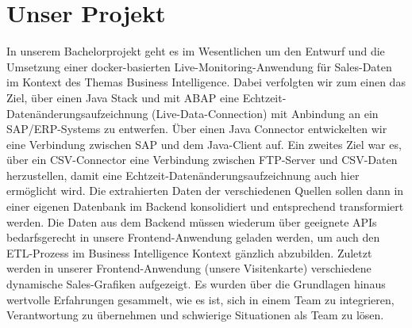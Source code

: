 \section*{Unser Projekt}
In unserem Bachelorprojekt geht es im Wesentlichen um den Entwurf und die Umsetzung einer docker-basierten Live-Monitoring-Anwendung für Sales-Daten im Kontext des Themas Business Intelligence.
\newline
\newline
Dabei verfolgten wir zum einen das Ziel, über einen Java Stack und mit ABAP  eine Echtzeit-Datenänderungsaufzeichnung (Live-Data-Connection) mit Anbindung an ein SAP/ERP-Systems zu entwerfen. Über einen Java Connector entwickelten wir eine Verbindung zwischen SAP und dem Java-Client auf. Ein zweites Ziel war es, über ein CSV-Connector eine Verbindung zwischen FTP-Server und CSV-Daten herzustellen, damit eine Echtzeit-Datenänderungsaufzeichnung auch hier ermöglicht wird.
\newline
Die extrahierten Daten der verschiedenen Quellen sollen dann in einer eigenen Datenbank im Backend konsolidiert und entsprechend transformiert werden.
\newline
\newline
Die Daten aus dem Backend müssen wiederum über geeignete APIs bedarfsgerecht in unsere Frontend-Anwendung geladen werden, um auch den ETL-Prozess im Business Intelligence Kontext gänzlich abzubilden.
\newline
\newline
Zuletzt werden in unserer Frontend-Anwendung (unsere Visitenkarte) verschiedene dynamische Sales-Grafiken aufgezeigt.
\newline
Es wurden über die Grundlagen hinaus wertvolle Erfahrungen gesammelt, wie es ist, sich in einem Team zu integrieren, Verantwortung zu übernehmen und schwierige Situationen als Team zu lösen.

